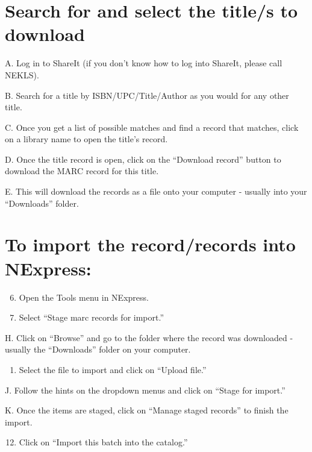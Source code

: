 \documentclass[letterpaper,10pt,english]{sphinxmanual}
\begin{document}
\section{Search for and select the title/s to download}
\label{\detokenize{copy-cataloging/adding-a-title-from-shareit:search-for-and-select-the-title-s-to-download}}
A. Log in to ShareIt (if you don’t know how to log into ShareIt, please
call NEKLS).

B. Search for a title by ISBN/UPC/Title/Author as you would for any
other title.

C. Once you get a list of possible matches and find a record that
matches, click on a library name to open the title’s record.

D. Once the title record is open, click on the “Download record” button
to download the MARC record for this title.

E. This will download the records as a file onto your computer - usually
into your “Downloads” folder.


\section{To import the record/records into NExpress:}
\label{\detokenize{copy-cataloging/adding-a-title-from-shareit:to-import-the-record-records-into-nexpress}}\begin{enumerate}
\setcounter{enumi}{5}
\item {} 
Open the Tools menu in NExpress.

\end{enumerate}
\begin{enumerate}
\setcounter{enumi}{6}
\item {} 
Select “Stage marc records for import.”

\end{enumerate}

H. Click on “Browse” and go to the folder where the record was
downloaded - usually the “Downloads” folder on your computer.
\begin{enumerate}
\item {} 
Select the file to import and click on “Upload file.”

\end{enumerate}

J. Follow the hints on the dropdown menus and click on “Stage for
import.”

K. Once the items are staged, click on “Manage staged records” to finish
the import.
\begin{enumerate}
\setcounter{enumi}{11}
\item {} 
Click on “Import this batch into the catalog.”

\end{enumerate}
\end{document}
